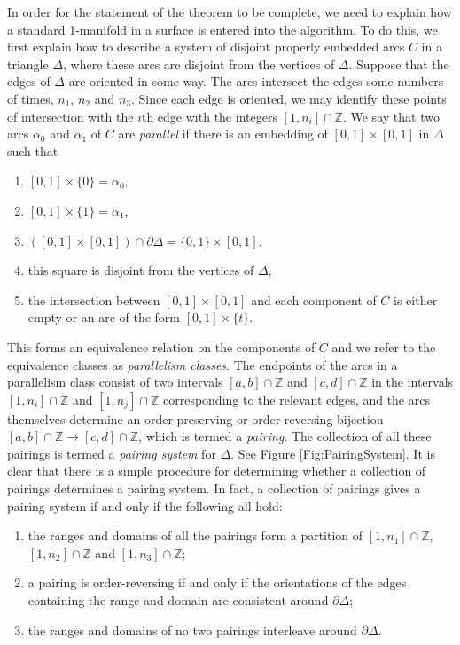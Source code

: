 \documentclass[oneside]{amsart}
\numberwithin{equation}{section}
\theoremstyle{plain}
\theoremstyle{definition}
\begin{document}
In order for the statement of the theorem to be complete, we need to explain how a standard 1-manifold in a surface is entered into the algorithm. 
To do this, we first explain how to describe a system of disjoint properly embedded arcs $C$ in a triangle $\Delta$, where these arcs are disjoint from the vertices of $\Delta$. Suppose that the edges of $\Delta$ are oriented in some way. The arcs intersect the edges some numbers of times, $n_1$, $n_2$ and $n_3$. Since each edge is oriented, we may identify these points of intersection with the $i$th edge with the integers $[1,n_i] \cap \mathbb{Z}$. We say that two arcs $\alpha_0$ and $\alpha_1$ of $C$ are \emph{parallel} if there is an embedding of $[0,1] \times [0,1]$ in $\Delta$ such that 
\begin{enumerate}
\item $[0,1] \times \{ 0 \} = \alpha_0$, 
\item $[0,1] \times \{ 1 \} = \alpha_1$, 
\item $([0,1] \times [0,1]) \cap \partial \Delta = \{ 0,1 \} \times [0,1]$,
\item this square is disjoint from the vertices of $\Delta$,
\item the intersection between $[0,1] \times [0,1]$ and each component of $C$ is either empty or an arc of the form $[0,1] \times \{ t \}$. 
\end{enumerate}
This forms an equivalence relation on the components of $C$ and we refer to the equivalence classes as \emph{parallelism classes}. The endpoints of the arcs in a parallelism class consist of two intervals $[a,b] \cap \mathbb{Z}$ and $[c,d] \cap \mathbb{Z}$ in the intervals $[1,n_i] \cap \mathbb{Z}$ and $[1,n_j] \cap \mathbb{Z}$ corresponding to the relevant edges, and the arcs themselves determine an order-preserving or order-reversing bijection $[a,b] \cap \mathbb{Z} \rightarrow [c,d] \cap \mathbb{Z}$, which is termed a \emph{pairing}. The collection of all these pairings is termed a \emph{pairing system} for $\Delta$. See Figure \ref{Fig:PairingSystem}. It is clear that there is a simple procedure for determining whether a collection of pairings determines a pairing system. In fact, a collection of pairings gives a pairing system if and only if the following all hold:
\begin{enumerate}
\item the ranges and domains of all the pairings form a partition of $[1,n_1] \cap \mathbb{Z}$, $[1,n_2] \cap \mathbb{Z}$ and $[1,n_3] \cap \mathbb{Z}$; 
\item a pairing is order-reversing if and only if the orientations of the edges containing the range and domain are consistent around $\partial \Delta$; 
\item the ranges and domains of no two pairings interleave around $\partial \Delta$.
\end{enumerate}
\end{document}
